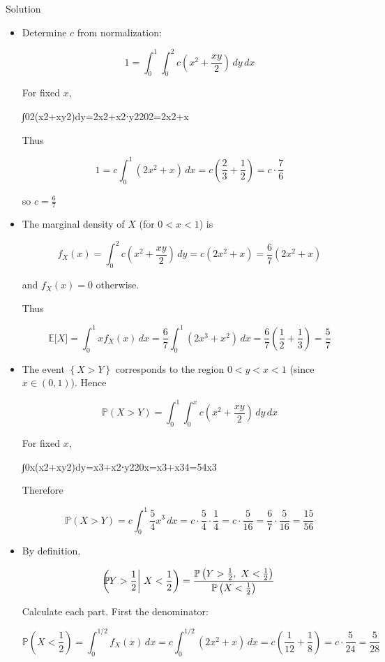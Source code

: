 \documentclass{qlnotes-export}
\begin{document}
\begin{qlsolution}{Solution}

\begin{itemize}
\item
  Determine \(c\) from normalization:

  \[1 = \int_{0}^{1}\int_{0}^{2}c\left( {x^{2} + \frac{xy}{2}} \right)\, dy\, dx\]

  For fixed \(x\),

  {∫02(x2+xy2)dy=2x2+x2⋅y2202=2x2+x}

  Thus

  \[1 = c\int_{0}^{1}(2x^{2} + x)\, dx = c\left( {\frac{2}{3} + \frac{1}{2}} \right) = c \cdot \frac{7}{6}\]

  so \(c = \frac{6}{7}\)
\item
  The marginal density of \(X\) (for \(0 < x < 1\)) is

  \[f_{X}(x) = \int_{0}^{2}c\left( {x^{2} + \frac{xy}{2}} \right)\, dy = c(2x^{2} + x) = \frac{6}{7}(2x^{2} + x)\]

  and \(f_{X}(x) = 0\) otherwise.

  Thus

  \[{\mathbb{E}}\lbrack X\rbrack = \int_{0}^{1}xf_{X}(x)\, dx = \frac{6}{7}\int_{0}^{1}(2x^{3} + x^{2})\, dx = \frac{6}{7}\left( {\frac{1}{2} + \frac{1}{3}} \right) = \frac{5}{7}\]
\item
  The event \(\left\{ {X > Y} \right\}\) corresponds to the region \(0 < y < x < 1\) (since \(x \in (0,1)\)). Hence

  \[{\mathbb{P}}(X > Y) = \int_{0}^{1}\int_{0}^{x}c\left( {x^{2} + \frac{xy}{2}} \right)\, dy\, dx\]

  For fixed \(x\),

  {∫0x(x2+xy2)dy=x3+x2⋅y220x=x3+x34=54x3}

  Therefore

  \[{\mathbb{P}}(X > Y) = c\int_{0}^{1}\frac{5}{4}x^{3}\, dx = c \cdot \frac{5}{4} \cdot \frac{1}{4} = c \cdot \frac{5}{16} = \frac{6}{7} \cdot \frac{5}{16} = \frac{15}{56}\]
\item
  By definition,

  \[{\mathbb{P}}\mspace{-18mu}\left( Y > \frac{1}{2} \middle| \ X < \frac{1}{2} \right) = \frac{{\mathbb{P}}\left( {Y > \frac{1}{2},\ X < \frac{1}{2}} \right)}{{\mathbb{P}}\left( {X < \frac{1}{2}} \right)}\]

  Calculate each part. First the denominator:

  \[{\mathbb{P}}\left( {X < \frac{1}{2}} \right) = \int_{0}^{1/2}f_{X}(x)\, dx = c\int_{0}^{1/2}(2x^{2} + x)\, dx = c\left( {\frac{1}{12} + \frac{1}{8}} \right) = c \cdot \frac{5}{24} = \frac{5}{28}\]


\end{itemize}
\end{qlsolution}
\end{document}
